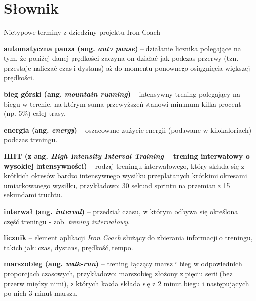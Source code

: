 

\newcommand{\dicen}[1]{
\item\textbf{#1}
}




\section{Słownik}
\noindent Nietypowe terminy z dziedziny projektu Iron Coach
\begin{multicols}{2}
\begin{description}
	\dicen{automatyczna pauza (ang. \textit{auto pause})}-- działanie licznika polegające na tym, że poniżej danej prędkości zaczyna on działać jak podczas przerwy (tzn. przestaje naliczać czas i dystans) aż do momentu ponownego osiągnięcia większej prędkości.\\
	\dicen{bieg górski (ang. \textit{mountain running})}-- intensywny trening polegający na biegu w terenie, na którym suma przewyższeń stanowi minimum kilka procent (np. 5\%) całej trasy.\\
	\dicen{energia (ang. \textit{energy})}-- oszacowane zużycie energii (podawane w kilokaloriach) podczas treningu.\\
	\dicen{HIIT (z ang. \textit{High Intensity Interval Training} -- trening interwałowy o wysokiej intensywności)}-- rodzaj treningu interwałowego, który składa się z krótkich okresów bardzo intensywnego wysiłku przeplatanych krótkimi okresami umiarkowanego wysiłku, przykładowo: 30 sekund sprintu na przemian z 15 sekundami truchtu.\\
	\dicen{interwał (ang. \textit{interval})}-- przedział czasu, w którym odbywa się określona część treningu - zob. \textit{trening interwałowy}.\\
	\dicen{licznik}-- element aplikacji \textit{Iron Coach} służący do zbierania informacji o treningu, takich jak: czas, dystans, prędkość, tempo.\\
	\dicen{marszobieg (ang. \textit{walk-run})}-- trening łączący marsz i bieg w odpowiednich proporcjach czasowych, przykładowo: marszobieg złożony z pięciu serii (bez przerw między nimi), z których każda składa się z 2 minut biegu i następujących po nich 3 minut marszu.\\

\end{description}
\end{multicols}
